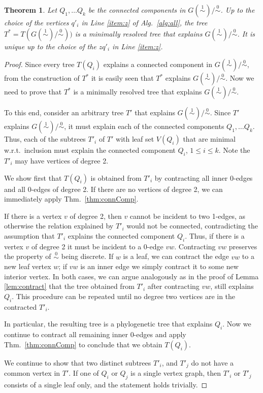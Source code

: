 \documentclass[smallextended]{svjour3}
\newcommand{\rev}[1]{\begingroup\color{blue}#1\endgroup}
\newcommand{\Ro}{\mathrel{\overset{0}{\sim}}}
\newcommand{\Rl}{\mathrel{\overset{1}{\sim}}}
\newtheorem{thm}{Theorem}
\begin{document}
\begin{thm}
  Let $Q_1,\dots Q_k$ be the connected components in $G(\Rl)/\Ro$.  Up to
  the choice of the vertices $q'_i$ in Line \ref{item:z} of Alg.\
  \ref{alg:all}, the tree $T^* = T(G(\Rl)/\Ro))$ is a \rev{minimally
    resolved tree that explains $G(\Rl)/\Ro$. It is unique up to the choice
    of the $zq'_i$ in Line \ref{item:z}.}
  \label{thm:star-tree}
\end{thm}
\begin{proof}
 \rev{ Since every tree $T(Q_i)$ explains a connected component in $G(\Rl)/\Ro$,
  from the construction of $T^*$ it is easily seen that $T^*$ explains
  $G(\Rl)/\Ro$.  Now we need to prove that $T^*$ is a minimally resolved
  tree that explains $G(\Rl)/\Ro$.

  To this end, consider an arbitrary tree $T'$ that explains $G(\Rl)/\Ro$.
  Since $T'$ explains $G(\Rl)/\Ro$, it must explain each of the connected
  components $Q_1,\dots Q_k$. Thus, each of the subtrees $T'_i$ of $T'$
  with leaf set $V(Q_i)$ that are minimal w.r.t.\ inclusion must explain
  the connected component $Q_i$, $1\le i \le k$.  Note the $T'_i$ may have
  vertices of degree 2.

  We show first that $T(Q_i)$ is obtained from $T'_i$ by contracting all
  inner 0-edges and all 0-edges of degree 2.  If there are no vertices of
  degree 2, we can immediately apply Thm.\ \ref{thm:connComp}.

  If there is a vertex $v$ of degree 2, then $v$ cannot be incident to two
  1-edges, as otherwise the relation explained by $T'_i$ would not be
  connected, contradicting the assumption that $T'_i$ explains the
  connected component $Q_i$.  Thus, if there is a vertex $v$ of degree 2 it
  must be incident to a 0-edge $vw$.  Contracting $vw$ preserves the
  property of $\Ro$ being discrete.  If $w$ is a leaf, we can contract the
  edge $vw$ to a new leaf vertex $w$; if $vw$ is an inner edge we simply
  contract it to some new interior vertex. In both cases, we can argue
  analogously as in the proof of Lemma \ref{lem:contract} that the tree
  obtained from $T'_i$ after contracting $vw$, still explains $Q_i$.  This
  procedure can be repeated until no degree two vertices are in the
  contracted $T'_i$.

  In particular, the resulting tree is a phylogenetic tree that explains
  $Q_i$. Now we continue to contract all remaining inner 0-edges and apply
  Thm.\ \ref{thm:connComp} to conclude that we obtain $T(Q_i)$.

  We continue to show that two distinct subtrees $T'_i$, and $T'_j$ do not
  have a common vertex in $T'$.  If one of $Q_i$ or $Q_j$ is a single
  vertex graph, then $T'_i$ or $T'_j$ consists of a single leaf only, and
  the statement holds trivially.

}
\end{proof}
\end{document}
